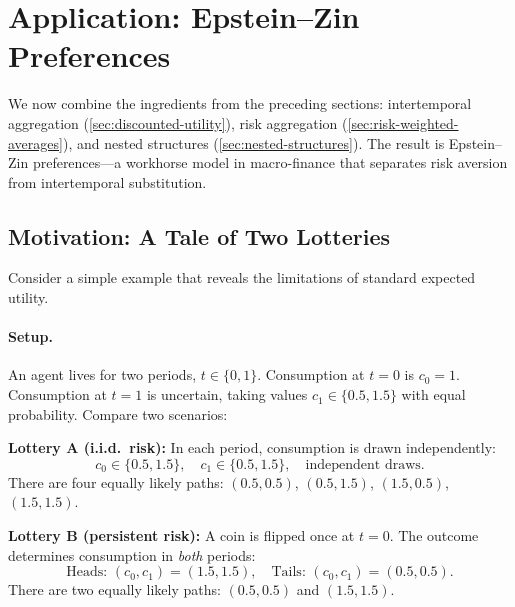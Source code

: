 \section{Application: Epstein--Zin Preferences}
\label{sec:epstein-zin}

We now combine the ingredients from the preceding sections: intertemporal aggregation (\cref{sec:discounted-utility}), risk aggregation (\cref{sec:risk-weighted-averages}), and nested structures (\cref{sec:nested-structures}). The result is Epstein--Zin preferences---a workhorse model in macro-finance that separates risk aversion from intertemporal substitution.

\subsection{Motivation: A Tale of Two Lotteries}
\label{subsec:motivation-breaking}

Consider a simple example that reveals the limitations of standard expected utility.

\paragraph{Setup.}
An agent lives for two periods, $t \in \{0, 1\}$. Consumption at $t=0$ is $c_0 = 1$. Consumption at $t=1$ is uncertain, taking values $c_1 \in \{0.5, 1.5\}$ with equal probability. Compare two scenarios:

\medskip
\noindent\textbf{Lottery A (i.i.d.\ risk):} In each period, consumption is drawn independently:
\begin{equation}
c_0 \in \{0.5, 1.5\}, \quad c_1 \in \{0.5, 1.5\}, \quad \text{independent draws.}
\end{equation}
There are four equally likely paths: $(0.5, 0.5)$, $(0.5, 1.5)$, $(1.5, 0.5)$, $(1.5, 1.5)$.

\medskip
\noindent\textbf{Lottery B (persistent risk):} A coin is flipped once at $t=0$. The outcome determines consumption in \emph{both} periods:
\begin{equation}
\text{Heads: } (c_0, c_1) = (1.5, 1.5), \quad \text{Tails: } (c_0, c_1) = (0.5, 0.5).
\end{equation}
There are two equally likely paths: $(0.5, 0.5)$ and $(1.5, 1.5)$.

